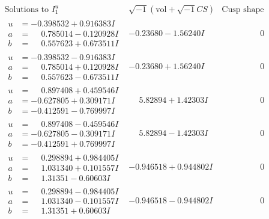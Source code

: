 \documentclass[1p]{elsarticle_modified}
\theoremstyle{definition}
\newcommand{\I}{\sqrt{-1}}
\begin{document}
$$\begin{array}{c|c|c}  
\text{Solutions to }I^u_{1}& \I (\text{vol} + \sqrt{-1}CS) & \text{Cusp shape}\\
 \hline 
\begin{aligned}
u &= -0.398532 + 0.916383 I \\
a &= \phantom{-}0.785014 - 0.120928 I \\
b &= \phantom{-}0.557623 + 0.673511 I\end{aligned}
 & -0.23680 - 1.56240 I & \phantom{-0.000000 } 0 \\ \hline\begin{aligned}
u &= -0.398532 - 0.916383 I \\
a &= \phantom{-}0.785014 + 0.120928 I \\
b &= \phantom{-}0.557623 - 0.673511 I\end{aligned}
 & -0.23680 + 1.56240 I & \phantom{-0.000000 } 0 \\ \hline\begin{aligned}
u &= \phantom{-}0.897408 + 0.459546 I \\
a &= -0.627805 + 0.309171 I \\
b &= -0.412591 - 0.769997 I\end{aligned}
 & \phantom{-}5.82894 + 1.42303 I & \phantom{-0.000000 } 0 \\ \hline\begin{aligned}
u &= \phantom{-}0.897408 - 0.459546 I \\
a &= -0.627805 - 0.309171 I \\
b &= -0.412591 + 0.769997 I\end{aligned}
 & \phantom{-}5.82894 - 1.42303 I & \phantom{-0.000000 } 0 \\ \hline\begin{aligned}
u &= \phantom{-}0.298894 + 0.984405 I \\
a &= \phantom{-}1.031340 + 0.101557 I \\
b &= \phantom{-}1.31351 - 0.60603 I\end{aligned}
 & -0.946518 + 0.944802 I & \phantom{-0.000000 } 0 \\ \hline\begin{aligned}
u &= \phantom{-}0.298894 - 0.984405 I \\
a &= \phantom{-}1.031340 - 0.101557 I \\
b &= \phantom{-}1.31351 + 0.60603 I\end{aligned}
 & -0.946518 - 0.944802 I & \phantom{-0.000000 } 0 \\ \hline\begin{aligned}

\end{aligned}
\end{array}$$
\end{document}
